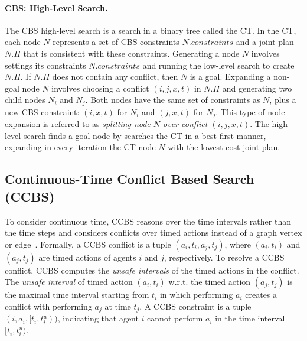 \documentclass[letterpaper]{article} %
\newcommand\roni[1]{\nb{\textbf{Roni:}}{orange}{#1}}
\newcommand{\cbs}{\ac{CBS}\xspace}
\newcommand{\ccbs}{\ac{CCBS}\xspace}
\newcommand{\ct}{\ac{CT}\xspace}
\newcommand{\mapfr}{{MAPF}$_R$\xspace}
\newcommand{\const}{\textit{constraints}\xspace}
\begin{document}
\paragraph{\cbs: High-Level Search.}
The \cbs high-level search is a search in a binary tree called the \ct. 
In the \ct, each node $N$ represents a set of \cbs constraints $N.\const$
and a joint plan $N.\Pi$ that is consistent with these constraints. 
Generating a node $N$ involves settings its constraints $N.\const$ and running the low-level search to create $N.\Pi$. 
If $N.\Pi$ does not contain any conflict, then $N$ is a goal. 
Expanding a non-goal node $N$ involves choosing a conflict $(i,j,x,t)$ in $N.\Pi$ 
and generating two child nodes $N_i$ and $N_j$. 
Both nodes have the same set of constraints as $N$, plus a new \cbs constraint: $(i,x,t)$ for $N_i$ and $(j,x,t)$ for $N_j$. 
This type of node expansion is referred to as \emph{splitting node $N$ over conflict $(i,j,x,t)$}.
The high-level search finds a goal node by searches the \ct in a best-first manner, expanding in every iteration the \ct node $N$ with the lowest-cost joint plan.



\subsection{Continuous-Time Conflict Based Search (CCBS)}



To consider continuous time, \ccbs reasons over the time intervals rather than the time steps and considers conflicts over timed actions instead of a graph vertex or edge~\cite{andreychuk2019multi}. 
Formally, a \ccbs conflict is a tuple $(a_i, t_i, a_j, t_j)$, where $(a_i, t_i)$ and $(a_j, t_j)$ are timed actions of agents $i$ and $j$, respectively. 
To resolve a \ccbs conflict, \ccbs computes the \emph{unsafe intervals} of the timed actions in the conflict.  
The \emph{unsafe interval} of timed action $(a_i, t_i)$ w.r.t. the timed action $(a_j, t_j)$
is the maximal time interval starting from $t_i$ in which performing $a_i$ creates a conflict with performing $a_j$ at time $t_j$. \roni{Bad connection}
A \ccbs constraint is a tuple $(i, a_i, [t_i, t_i^u))$, indicating that 
agent $i$ cannot perform $a_i$ in the time interval $[t_i, t_i^u)$. 
\end{document}
